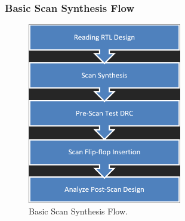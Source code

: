 \documentclass[a4paper,12pt,twoside]{article}
\begin{document}
\subsubsection{Basic Scan Synthesis Flow}
\begin{figure}[H]
    \centering
    \includegraphics[width=0.6\textwidth]{images/24.png}
    \caption{Basic Scan Synthesis Flow.}
\end{figure}
\end{document}
